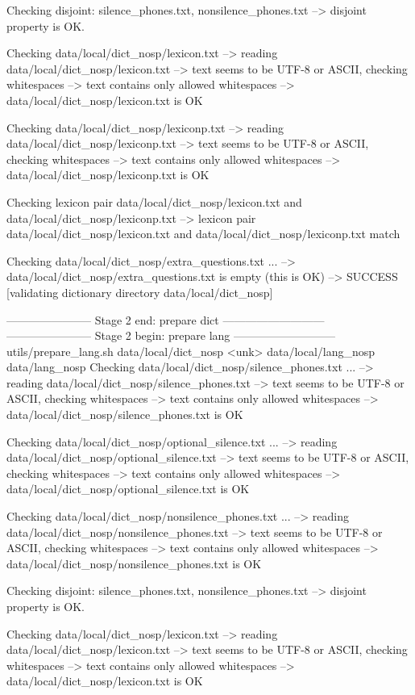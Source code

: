 Checking disjoint: silence_phones.txt, nonsilence_phones.txt
--> disjoint property is OK.

Checking data/local/dict_nosp/lexicon.txt
--> reading data/local/dict_nosp/lexicon.txt
--> text seems to be UTF-8 or ASCII, checking whitespaces
--> text contains only allowed whitespaces
--> data/local/dict_nosp/lexicon.txt is OK

Checking data/local/dict_nosp/lexiconp.txt
--> reading data/local/dict_nosp/lexiconp.txt
--> text seems to be UTF-8 or ASCII, checking whitespaces
--> text contains only allowed whitespaces
--> data/local/dict_nosp/lexiconp.txt is OK

Checking lexicon pair data/local/dict_nosp/lexicon.txt and data/local/dict_nosp/lexiconp.txt
--> lexicon pair data/local/dict_nosp/lexicon.txt and data/local/dict_nosp/lexiconp.txt match

Checking data/local/dict_nosp/extra_questions.txt ...
--> data/local/dict_nosp/extra_questions.txt is empty (this is OK)
--> SUCCESS [validating dictionary directory data/local/dict_nosp]

----------------------- Stage 2 end: prepare dict ---------------------------
----------------------- Stage 2 begin: prepare lang ---------------------------
utils/prepare_lang.sh data/local/dict_nosp <unk> data/local/lang_nosp data/lang_nosp
Checking data/local/dict_nosp/silence_phones.txt ...
--> reading data/local/dict_nosp/silence_phones.txt
--> text seems to be UTF-8 or ASCII, checking whitespaces
--> text contains only allowed whitespaces
--> data/local/dict_nosp/silence_phones.txt is OK

Checking data/local/dict_nosp/optional_silence.txt ...
--> reading data/local/dict_nosp/optional_silence.txt
--> text seems to be UTF-8 or ASCII, checking whitespaces
--> text contains only allowed whitespaces
--> data/local/dict_nosp/optional_silence.txt is OK

Checking data/local/dict_nosp/nonsilence_phones.txt ...
--> reading data/local/dict_nosp/nonsilence_phones.txt
--> text seems to be UTF-8 or ASCII, checking whitespaces
--> text contains only allowed whitespaces
--> data/local/dict_nosp/nonsilence_phones.txt is OK

Checking disjoint: silence_phones.txt, nonsilence_phones.txt
--> disjoint property is OK.

Checking data/local/dict_nosp/lexicon.txt
--> reading data/local/dict_nosp/lexicon.txt
--> text seems to be UTF-8 or ASCII, checking whitespaces
--> text contains only allowed whitespaces
--> data/local/dict_nosp/lexicon.txt is OK

